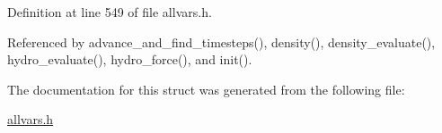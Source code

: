 Definition at line 549 of file allvars.h.



Referenced by advance\_\-and\_\-find\_\-timesteps(), density(), density\_\-evaluate(), hydro\_\-evaluate(), hydro\_\-force(), and init().



The documentation for this struct was generated from the following file:\begin{DoxyCompactItemize}
\item 
\hyperlink{allvars_8h}{allvars.h}\end{DoxyCompactItemize}
